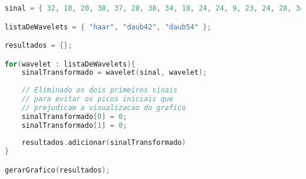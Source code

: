 \begin{lstlisting}[language=C++, caption={Algoritmo que caracteriza o procedimento 04}, label={lst:experiment04Algo}]
sinal = { 32, 10, 20, 38, 37, 28, 38, 34, 18, 24, 24, 9, 23, 24, 28, 34, 32, 10, 20, 38, 37, 28, 38, 34, 18, 24, 24, 9, 23,...};

listaDeWavelets = { "haar", "daub42", "daub54" };

resultados = {};

for(wavelet : listaDeWavelets){
	sinalTransformado = wavelet(sinal, wavelet);
	
	// Eliminado os dois primeiros sinais 
	// para evitar os picos iniciais que
	// prejudicam a visualizacao do grafico
	sinalTransformado[0] = 0;
	sinalTransformado[1] = 0;
	
	resultados.adicionar(sinalTransformado)
}

gerarGrafico(resultados);
\end{lstlisting}